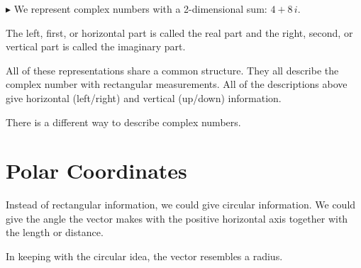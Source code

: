 \documentclass{ximera}
\begin{document}
\begin{image}
\end{image}





$\blacktriangleright$ We represent complex numbers with a 2-dimensional sum: $4 + 8 \, i$.



The left, first, or horizontal part is called the real part and the right, second, or vertical part is called the imaginary part.




All of these representations share a common structure.  They all describe the complex number with rectangular measurements.  All of the descriptions above give horizontal (left/right) and vertical (up/down) information.


There is a different way to describe complex numbers.



\section{Polar Coordinates}

Instead of rectangular information, we could give circular information.  We could give the angle the vector makes with the positive horizontal axis together with the length or distance. 

In keeping with the circular idea, the vector resembles a radius.  
\end{document}

